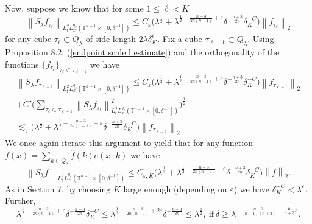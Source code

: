 \documentclass[11pt]{amsart}
\numberwithin{equation}{section}
\newcommand{\Tn}{\mathbb{T}^{n-1}}
\newcommand{\la}{\lambda}
\newcommand\norm[1]{\left\lVert#1\right\rVert}
\newcommand{\altlpnorm}[2]{\norm{#1}_{#2}}
\newcommand{\mixlpnorm}[4]{\norm{#1}_{L^{#2}_{t} L^{#3}_{x}(#4)}}
\newcommand{\Sl}{S_{\la}}
\newcommand{\dK}[1]{\delta_{K}^{#1}}
\begin{document}
Now, suppose we know that for some $1 \leq \ell < K$
\begin{equation} \label{endpoint scale l estimate}
    \mixlpnorm{\Sl f_{\tau_{\ell}}}{2}{q_e}{\Tn\times[0, \delta^{-1}]} \leq C_{\varepsilon}\big(\la^{\frac{1}{2}} +  \la^{\frac{1}{2} - \frac{n-3}{2n(n-1)}+\varepsilon}\delta^{-\frac{n+3}{2n}}\dK{-C}\big)\altlpnorm{f_{\tau_{\ell}}}{2}
\end{equation}
for any cube $\tau_{\ell} \subset Q_{\la}$ of side-length $2\la \dK{\ell}$. Fix a cube $\tau_{\ell - 1} \subset Q_{\la}$. Using Proposition 8.2, (\ref{endpoint scale l estimate}) and the orthogonality of the functions $\{f_{\tau_{\ell}}\}_{\tau_{\ell}\subset \tau_{\ell - 1}}$ we have
\begin{equation}
\begin{split}
    \mixlpnorm{\Sl f_{\tau_{\ell-1}}}{2}{q_e}{\Tn\times[0, \delta^{-1}]} \leq C_{\varepsilon} \big(\la^{\frac{1}{2}} +  \la^{\frac{1}{2} - \frac{n-3}{2n(n-1)}+\varepsilon}\delta^{-\frac{n+3}{2n}}\dK{-C}\big)\altlpnorm{f_{\tau_{\ell-1}}}{2} \\
    + C'\Big(\sum_{\tau_{\ell} \subset \tau_{\ell-1}}\mixlpnorm{\Sl f_{\tau_{\ell}}}{2}{q_e}{\Tn \times [0, \delta^{-1}]}^{2}\Big)^{\frac{1}{2}} \\
    \lesssim_{\varepsilon} \big(\la^{\frac{1}{2}} +  \la^{\frac{1}{2} - \frac{n-3}{2n(n-1)}+\varepsilon}\delta^{-\frac{n+3}{2n}}\dK{-C}\big)\altlpnorm{f_{\tau_{\ell-1}}}{2}
\end{split}
\end{equation}
We once again iterate this argument to yield that for any function $ f(x) = \sum_{k \in \tilde{Q_{\la}}}\widehat{f}(k)e(x \cdot k)$ we have
\begin{equation}
    \mixlpnorm{\Sl f}{2}{q_e}{\Tn \times [0, \delta^{-1}]} \leq C_{\varepsilon, K}\big(\la^{\frac{1}{2}} +  \la^{\frac{1}{2} - \frac{n-3}{2n(n-1)} + \varepsilon}\delta^{-\frac{n+3}{2n}}\dK{-C}\big)\altlpnorm{f}{2}.
\end{equation}
As in Section 7, by choosing $K$ large enough (depending on $\varepsilon$) we have $\dK{-C} < \la^{\varepsilon}$. Further, 
\begin{equation}
    \la^{\frac{1}{2} - \frac{n-3}{2n(n-1)} + \varepsilon}\delta^{-\frac{n+3}{2n}}\dK{-C} \leq \la^{\frac{1}{2} - \frac{n-3}{2n(n-1)} + 2\varepsilon}\delta^{-\frac{n+3}{2n}} \leq \la^{\frac{1}{2}}, \ \text{if} \ \delta \geq \la^{-\frac{n-3}{(n-1)(n+3)} + \frac{4n}{n+3}\varepsilon}.  
\end{equation}
\end{document}
